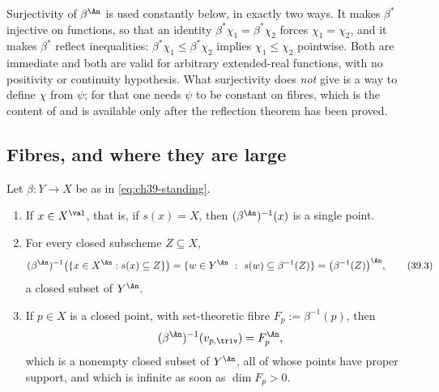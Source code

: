 \begin{remark}
\label{rem:ch39-surjectivity}
Surjectivity of $\beta^{\An}$ is used constantly below, in exactly two
ways.  It makes $\beta^*$ injective on functions, so that an identity
$\beta^*\chi_1=\beta^*\chi_2$ forces $\chi_1=\chi_2$, and it makes
$\beta^*$ reflect inequalities: $\beta^*\chi_1\le\beta^*\chi_2$ implies
$\chi_1\le\chi_2$ pointwise.  Both are immediate and both are valid for
arbitrary extended-real functions, with no positivity or continuity
hypothesis.  What surjectivity does \emph{not} give is a way to define
$\chi$ from $\psi$; for that one needs $\psi$ to be constant on fibres,
which is the content of  and is available only
after the reflection theorem has been proved.
\end{remark}

\subsection{Fibres, and where they are large}
\label{sec:ch39-fibres}

\begin{proposition}
\label{prop:ch39-fibres}
Let $\beta:Y\to X$ be as in \eqref{eq:ch39-standing}.
\begin{enumerate}
\item\label{itm:ch39-fib:val} If $x\in X^{\val}$, that is, if $s(x)=X$,
 then $(\beta^{\An})^{-1}(x)$ is a single point.
\item\label{itm:ch39-fib:triv} For every closed subscheme $Z\subseteq X$,
\[
 (\beta^{\An})^{-1}\bigl(\{x\in X^{\An}:s(x)\subseteq Z\}\bigr)
 =\{w\in Y^{\An}\ :\ s(w)\subseteq\beta^{-1}(Z)\}
 =\bigl(\beta^{-1}(Z)\bigr)^{\An},
\tag{39.3}\label{eq:ch39-fibre-trivial}
\]
 a closed subset of $Y^{\An}$.
\item\label{itm:ch39-fib:point} If $p\in X$ is a closed point, with
 set-theoretic fibre $F_p:=\beta^{-1}(p)$, then
\[
 (\beta^{\An})^{-1}(v_{p,\triv})=F_p^{\An},
\]
 which is a nonempty closed subset of $Y^{\An}$, all of whose points have
 proper support, and which is infinite as soon as $\dim F_p>0$.
\end{enumerate}
\end{proposition}

